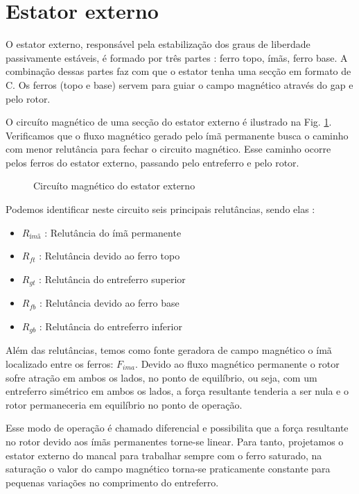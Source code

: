 \section{Estator externo}\label{cap:mancal:estator:externo}

O estator externo, responsável pela estabilização dos graus de liberdade passivamente estáveis, é formado por três partes : ferro topo, ímãs, ferro base. A combinação dessas partes faz com que o estator tenha uma secção em formato de C. Os ferros (topo e base) servem para guiar o campo magnético através do gap e pelo rotor. 

O circuíto magnético de uma secção do estator externo é ilustrado na Fig. \ref{Fig:mancal:circuito:passivo}. Verificamos que o fluxo magnético gerado pelo ímã permanente busca o caminho com menor relutância para fechar o circuito magnético. Esse caminho ocorre pelos ferros do estator externo, passando pelo entreferro e  pelo rotor.

\begin{figure}[!ht]
	\centering
	\def\svgwidth{1\columnwidth}
	
	\caption{Circuíto magnético do estator externo}
	\label{Fig:mancal:circuito:passivo}
\end{figure}

Podemos identificar neste circuito seis principais relutâncias, sendo elas :

\begin{itemize}
	\item $R_{ímã}$ : Relutância do ímã permanente
	\item $R_{ft}$ : Relutância devido ao ferro topo
	\item $R_{gt}$ : Relutância do entreferro superior
	\item $R_{fb}$ : Relutância devido ao ferro base
	\item $R_{gb}$ : Relutância do entreferro inferior	
\end{itemize}

Além das relutâncias, temos como fonte geradora de campo magnético o ímã localizado entre os ferros: $F_{ima}$. Devido ao fluxo magnético permanente o rotor sofre atração em ambos os lados, no ponto de equilíbrio, ou seja, com um entreferro simétrico em ambos os lados, a força resultante tenderia a ser nula e o rotor permaneceria em equilíbrio no ponto de operação. 

Esse modo de operação é chamado diferencial e possibilita que a força resultante no rotor devido aos ímãs permanentes torne-se linear. Para tanto, projetamos o estator externo do mancal para trabalhar sempre com o ferro saturado, na saturação o valor do campo magnético torna-se praticamente constante para pequenas variações no comprimento do entreferro.

